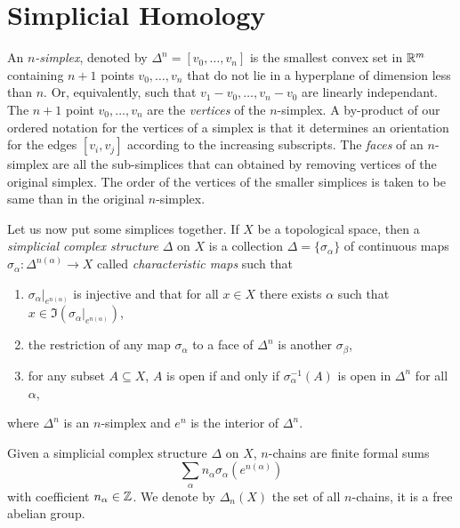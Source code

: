 \section{Simplicial Homology}

    An \emph{$n$-simplex}, denoted by $\Delta^n=[v_0,\dots,v_n]$ is the smallest convex set in $\mathbb{R}^m$ containing $n+1$ points $v_0,\dots,v_n$ that do not lie in a hyperplane of dimension less than $n$. Or, equivalently, such that $v_1-v_0,\dots,v_n-v_0$ are linearly independant. The $n+1$ point $v_0,\dots,v_n$ are the \emph{vertices} of the $n$-simplex. A by-product of our ordered notation for the vertices of a simplex is that it determines an orientation for the edges $[v_i,v_j]$ according to the increasing subscripts. The \emph{faces} of an $n$-simplex are all the sub-simplices that can obtained by removing vertices of the original simplex. The order of the vertices of the smaller simplices is taken to be same than in the original $n$-simplex. 
    
    Let us now put some simplices together. If $X$ be a topological space, then a \emph{simplicial complex structure} $\Delta$ on $X$ is a collection $\Delta=\{\sigma_\alpha\}$ of continuous maps $\sigma_\alpha:\Delta^{n(\alpha)}\to X$ called \emph{characteristic maps} such that
    \begin{enumerate}[label=\roman*)]
        \item $\sigma_\alpha|_{e^{n(\alpha)}}$ is injective and that for all $x\in X$ there exists $\alpha$ such that $x\in\Im(\sigma_\alpha|_{e^{n(\alpha)}})$,
        \item the restriction of any map $\sigma_\alpha$ to a face of $\Delta^n$ is another $\sigma_\beta$,
        \item for any subset $A\subseteq X$, $A$ is open if and only if $\sigma^{-1}_{\alpha}(A)$ is open in $\Delta^n$ for all $\alpha$,
    \end{enumerate}
    where $\Delta^n$ is an $n$-simplex and $e^n$ is the interior of $\Delta^n$. 

    Given a simplicial complex structure $\Delta$ on $X$, $n$-chains are finite formal sums
    \begin{equation}
        \sum_\alpha n_\alpha \sigma_\alpha(e^{n(\alpha)})
    \end{equation}
    with coefficient $n_\alpha\in\mathbb{Z}$. We denote by $\Delta_n(X)$ the set of all $n$-chains, it is a free abelian group.

